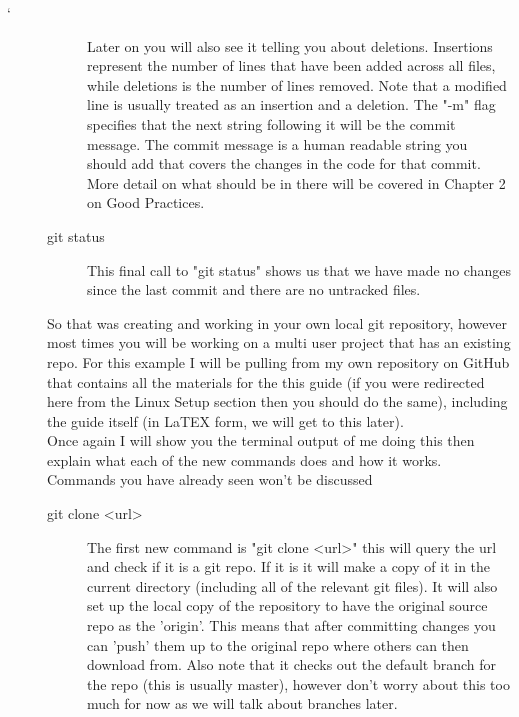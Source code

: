 `\documentclass[a4paper,11pt]{report}
\begin{document}
\begin{description}
\begin{description}
									Later on you will also see it telling you about deletions.
									Insertions represent the number of lines that have been added across all files, while deletions is the number of lines removed.
									Note that a modified line is usually treated as an insertion and a deletion.
									The "-m" flag specifies that the next string following it will be the commit message.
									The commit message is a human readable string you should add that covers the changes in the code for that commit.
									More detail on what should be in there will be covered in Chapter 2 on Good Practices.
								\item[git status]
									This final call to "git status" shows us that we have made no changes since the last commit and there are no untracked files.

							\end{description}

							So that was creating and working in your own local git repository, however most times you will be working on a multi user project that has an existing repo.
							For this example I will be pulling from my own repository on GitHub that contains all the materials for the this guide (if you were redirected here from the Linux Setup section then you should do the same), including the guide itself (in LaTEX form, we will get to this later).\\

							Once again I will show you the terminal output of me doing this then explain what each of the new commands does and how it works.
							Commands you have already seen won't be discussed\\

							

							\begin{description}

							\item[git clone <url>]
								The first new command is "git clone <url>" this will query the url and check if it is a git repo.
								If it is it will make a copy of it in the current directory (including all of the relevant git files).
								It will also set up the local copy of the repository to have the original source repo as the 'origin'.
								This means that after committing changes you can 'push' them up to the original repo where others can then download from.
								Also note that it checks out the default branch for the repo (this is usually master), however don't worry about this too much for now as we will talk about branches later.


\end{description}
\end{description}
\end{document}
